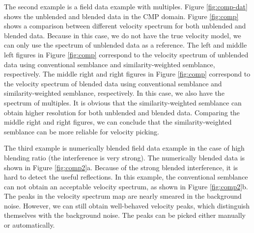 The second example is a field data example with multiples. Figure \ref{fig:comp-dat} shows the unblended and blended data in the CMP domain. Figure \ref{fig:comp} shows a comparison between different velocity spectrum for both unblended and blended data. Because in this case, we do not have the true velocity model, we can only use the spectrum of unblended data as a reference. The left and middle left figures in Figure \ref{fig:comp} correspond to the velocity spectrum of unblended data using conventional semblance and similarity-weighted semblance, respectively. The middle right and right figures in Figure \ref{fig:comp} correspond to the velocity spectrum of blended data using conventional semblance and similarity-weighted semblance, respectively. In this case, we also have the spectrum of multiples. It is obvious that the similarity-weighted semblance can obtain higher resolution for both unblended and blended data. Comparing the middle right and right figures, we can conclude that the similarity-weighted semblance can be more reliable for velocity picking.

The third example is  numerically blended field data example in the case of high blending ratio (the interference is very strong). The numerically blended data is shown in Figure \ref{fig:comp2}a. Because of the strong blended interference, it is hard to detect the useful reflections. In this example, the conventional semblance can not obtain an acceptable velocity spectrum, as shown in Figure \ref{fig:comp2}b. The peaks in the velocity spectrum map are nearly smeared in the background noise. However,  we can still obtain well-behaved velocity peaks,  which distinguish themselves with the background noise. The peaks can be picked either manually or automatically. 


